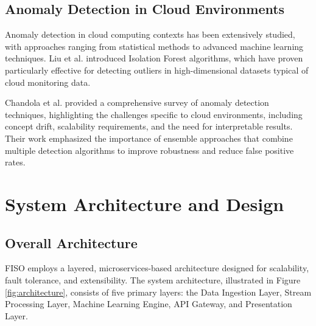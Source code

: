 \documentclass[conference]{IEEEtran}
\begin{document}
\subsection{Anomaly Detection in Cloud Environments}

Anomaly detection in cloud computing contexts has been extensively studied, with approaches ranging from statistical methods to advanced machine learning techniques. Liu et al. \cite{liu2008isolation} introduced Isolation Forest algorithms, which have proven particularly effective for detecting outliers in high-dimensional datasets typical of cloud monitoring data.

Chandola et al. \cite{chandola2009anomaly} provided a comprehensive survey of anomaly detection techniques, highlighting the challenges specific to cloud environments, including concept drift, scalability requirements, and the need for interpretable results. Their work emphasized the importance of ensemble approaches that combine multiple detection algorithms to improve robustness and reduce false positive rates.

\section{System Architecture and Design}

\subsection{Overall Architecture}

FISO employs a layered, microservices-based architecture designed for scalability, fault tolerance, and extensibility. The system architecture, illustrated in Figure \ref{fig:architecture}, consists of five primary layers: the Data Ingestion Layer, Stream Processing Layer, Machine Learning Engine, API Gateway, and Presentation Layer.
\end{document}
